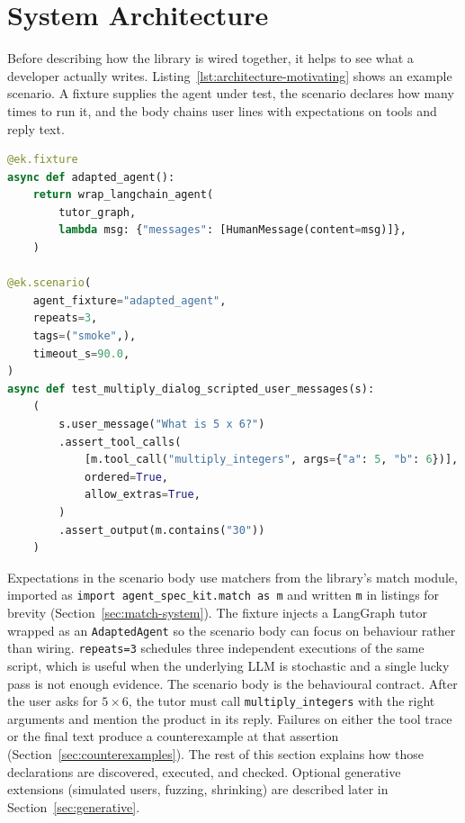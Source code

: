 \section{System Architecture}
\label{sec:architecture}

Before describing how the library is wired together, it helps to see what a developer actually writes. Listing~\ref{lst:architecture-motivating} shows an example scenario. A fixture supplies the agent under test, the scenario declares how many times to run it, and the body chains user lines with expectations on tools and reply text.

\begin{lstlisting}[language=Python,caption={Scenario with fixture, repeats, user line, tool and output checks.},label=lst:architecture-motivating]
@ek.fixture
async def adapted_agent():
    return wrap_langchain_agent(
        tutor_graph,
        lambda msg: {"messages": [HumanMessage(content=msg)]},
    )

@ek.scenario(
    agent_fixture="adapted_agent",
    repeats=3,
    tags=("smoke",),
    timeout_s=90.0,
)
async def test_multiply_dialog_scripted_user_messages(s):
    (
        s.user_message("What is 5 x 6?")
        .assert_tool_calls(
            [m.tool_call("multiply_integers", args={"a": 5, "b": 6})],
            ordered=True,
            allow_extras=True,
        )
        .assert_output(m.contains("30"))
    )
\end{lstlisting}

Expectations in the scenario body use matchers from the library's match module, imported as \texttt{import agent\_spec\_kit.match as m} and written \texttt{m} in listings for brevity (Section~\ref{sec:match-system}). The fixture injects a LangGraph tutor wrapped as an \texttt{AdaptedAgent} so the scenario body can focus on behaviour rather than wiring. \texttt{repeats=3} schedules three independent executions of the same script, which is useful when the underlying LLM is stochastic and a single lucky pass is not enough evidence. The scenario body is the behavioural contract. After the user asks for $5 \times 6$, the tutor must call \texttt{multiply\_integers} with the right arguments and mention the product in its reply. Failures on either the tool trace or the final text produce a counterexample at that assertion (Section~\ref{sec:counterexamples}). The rest of this section explains how those declarations are discovered, executed, and checked. Optional generative extensions (simulated users, fuzzing, shrinking) are described later in Section~\ref{sec:generative}.

